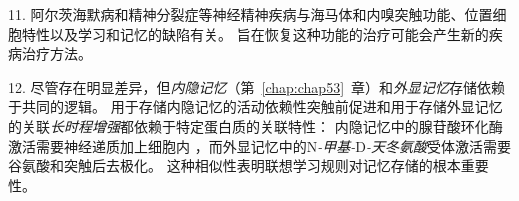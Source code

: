 11. 阿尔茨海默病和精神分裂症等神经精神疾病与海马体和内嗅突触功能、位置细胞特性以及学习和记忆的缺陷有关。
旨在恢复这种功能的治疗可能会产生新的疾病治疗方法。 


12. 尽管存在明显差异，但\textit{内隐记忆}（第~\ref{chap:chap53}~章）和\textit{外显记忆}存储依赖于共同的逻辑。
用于存储内隐记忆的活动依赖性突触前促进和用于存储外显记忆的关联\textit{长时程增强}都依赖于特定蛋白质的关联特性：
内隐记忆中的腺苷酸环化酶激活需要神经递质加上细胞内 ，而外显记忆中的N\textit{-甲基-}D\textit{-天冬氨酸}受体激活需要谷氨酸和突触后去极化。
这种相似性表明联想学习规则对记忆存储的根本重要性。






